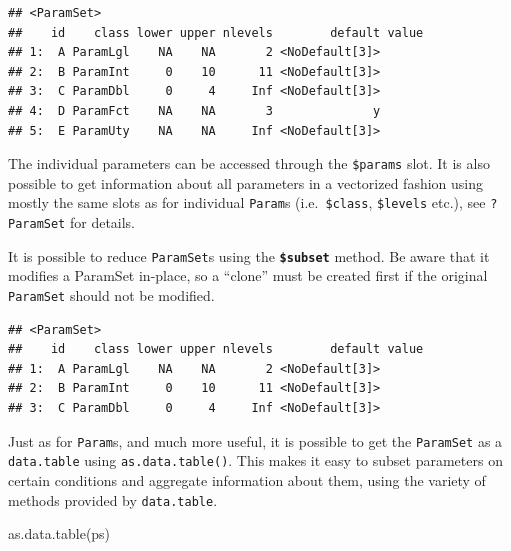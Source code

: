 \documentclass[
]{scrbook}
\newenvironment{Shaded}{\begin{snugshade}}{\end{snugshade}}
\newcommand{\FunctionTok}[1]{\textcolor[rgb]{0.00,0.00,0.00}{#1}}
\newcommand{\NormalTok}[1]{#1}
\newcommand{\OtherTok}[1]{\textcolor[rgb]{0.56,0.35,0.01}{#1}}
\newcommand{\SpecialCharTok}[1]{\textcolor[rgb]{0.00,0.00,0.00}{#1}}
\newcommand{\StringTok}[1]{\textcolor[rgb]{0.31,0.60,0.02}{#1}}
\renewenvironment{Shaded} {\begin{snugshade}\small} {\end{snugshade}}
\begin{document}
\begin{verbatim}
## <ParamSet>
##    id    class lower upper nlevels        default value
## 1:  A ParamLgl    NA    NA       2 <NoDefault[3]>      
## 2:  B ParamInt     0    10      11 <NoDefault[3]>      
## 3:  C ParamDbl     0     4     Inf <NoDefault[3]>      
## 4:  D ParamFct    NA    NA       3              y      
## 5:  E ParamUty    NA    NA     Inf <NoDefault[3]>
\end{verbatim}

The individual parameters can be accessed through the \texttt{\$params} slot.
It is also possible to get information about all parameters in a vectorized fashion using mostly the same slots as for individual \texttt{Param}s (i.e.~\texttt{\$class}, \texttt{\$levels} etc.), see \texttt{?ParamSet} for details.

It is possible to reduce \texttt{ParamSet}s using the \textbf{\texttt{\$subset}} method.
Be aware that it modifies a ParamSet in-place, so a ``clone'' must be created first if the original \texttt{ParamSet} should not be modified.

\begin{Shaded}
\end{Shaded}

\begin{verbatim}
## <ParamSet>
##    id    class lower upper nlevels        default value
## 1:  A ParamLgl    NA    NA       2 <NoDefault[3]>      
## 2:  B ParamInt     0    10      11 <NoDefault[3]>      
## 3:  C ParamDbl     0     4     Inf <NoDefault[3]>
\end{verbatim}

Just as for \texttt{Param}s, and much more useful, it is possible to get the \texttt{ParamSet} as a \texttt{data.table} using \texttt{as.data.table()}.
This makes it easy to subset parameters on certain conditions and aggregate information about them, using the variety of methods provided by \texttt{data.table}.

\begin{Shaded}
\begin{Highlighting}[]
\FunctionTok{as.data.table}\NormalTok{(ps)}
\end{Highlighting}
\end{Shaded}
\end{document}
